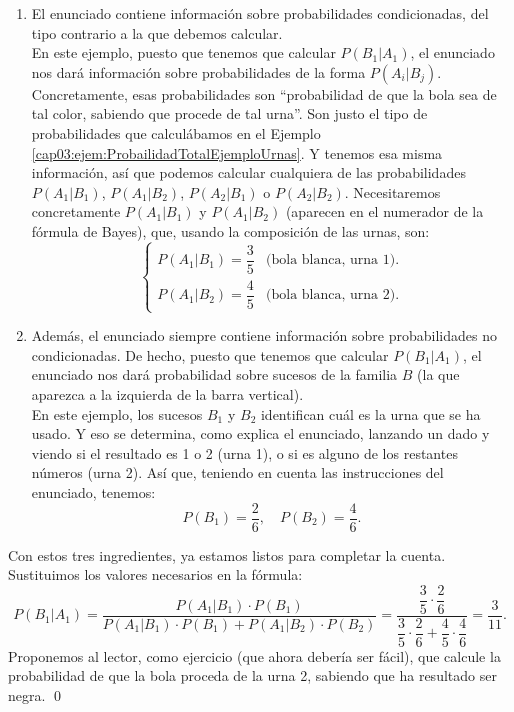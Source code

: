 \begin{Ejemplo}
\begin{enumerate}
        \item El enunciado contiene información sobre probabilidades condicionadas, del tipo contrario a la que debemos calcular.\\
            En este ejemplo, puesto que tenemos que calcular $P(B_1 | A_1)$, el enunciado nos dará información sobre probabilidades de la forma $P(A_i|B_j)$. Concretamente, esas probabilidades son ``probabilidad de que la bola sea de tal color, sabiendo que procede de tal urna''.  Son justo el tipo de probabilidades que calculábamos en el Ejemplo \ref{cap03:ejem:ProbailidadTotalEjemploUrnas}. Y tenemos esa misma información, así que podemos calcular cualquiera de las probabilidades $P(A_1|B_1)$, $P(A_1|B_2)$, $P(A_2|B_1)$ o $P(A_2|B_2)$. Necesitaremos concretamente $P(A_1 | B_1)$ y $P(A_1 | B_2)$ (aparecen en el numerador de la fórmula de Bayes), que, usando la composición de las urnas, son:
            \[
            \begin{cases}
                P(A_1 | B_1)=\dfrac{3}{5}& \mbox{(bola blanca, urna 1)}.\\[5mm]
                P(A_1 | B_2)=\dfrac{4}{5}& \mbox{(bola blanca, urna 2)}.
            \end{cases}
            \]

        \item Además, el enunciado siempre contiene información sobre probabilidades no condicionadas. De hecho, puesto que tenemos que calcular $P(B_1|A_1)$, el enunciado nos dará probabilidad sobre sucesos de la familia $B$ (la que aparezca a la izquierda de la barra vertical).\\
            En este ejemplo, los sucesos $B_1$ y $B_2$ identifican cuál es la urna que se ha usado. Y eso se determina, como explica el enunciado, lanzando un dado y viendo si el resultado es 1 o 2 (urna 1), o si es alguno de los restantes números (urna 2). Así que, teniendo en cuenta las instrucciones del enunciado, tenemos:
            \[P(B_1)=\dfrac{2}{6}, \quad P(B_2)=\dfrac{4}{6}.\]

    \end{enumerate}
    Con estos tres ingredientes, ya estamos listos para completar la cuenta. Sustituimos los valores necesarios en la fórmula:
            \[P(B_1 | A_1)=\dfrac{P(A_1 | B_1)\cdot P(B_1)}{P(A_1 | B_1)\cdot P(B_1)+P(A_1 | B_2)\cdot P(B_2)}=\dfrac{\dfrac{3}{5}\cdot \dfrac{2}{6}}{\dfrac{3}{5}\cdot \dfrac{2}{6}+\dfrac{4}{5}\cdot\dfrac{4}{6}}=\dfrac{3}{11}.\]
    Proponemos al lector, como ejercicio (que ahora debería ser fácil), que calcule la probabilidad de que la bola proceda de la urna 2, sabiendo que ha resultado ser negra. \qed
\end{Ejemplo}

